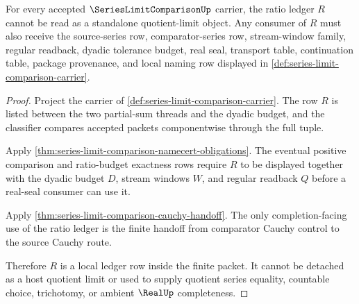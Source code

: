 \begin{theorem}\label{thm:series-limit-comparison-ratio-nonescape}
For every accepted $\SeriesLimitComparisonUp$ carrier, the ratio ledger $R$ cannot be read as a standalone quotient-limit object. Any consumer of $R$ must also receive the source-series row, comparator-series row, stream-window family, regular readback, dyadic tolerance budget, real seal, transport table, continuation table, package provenance, and local naming row displayed in \autoref{def:series-limit-comparison-carrier}.
\end{theorem}
\begin{proof}
Project the carrier of \autoref{def:series-limit-comparison-carrier}. The row $R$ is listed between the two partial-sum threads and the dyadic budget, and the classifier compares accepted packets componentwise through the full tuple.

Apply \autoref{thm:series-limit-comparison-namecert-obligations}. The eventual positive comparison and ratio-budget exactness rows require $R$ to be displayed together with the dyadic budget $D$, stream windows $W$, and regular readback $Q$ before a real-seal consumer can use it.

Apply \autoref{thm:series-limit-comparison-cauchy-handoff}. The only completion-facing use of the ratio ledger is the finite handoff from comparator Cauchy control to the source Cauchy route.

Therefore $R$ is a local ledger row inside the finite packet. It cannot be detached as a host quotient limit or used to supply quotient series equality, countable choice, trichotomy, or ambient $\RealUp$ completeness.
\end{proof}



